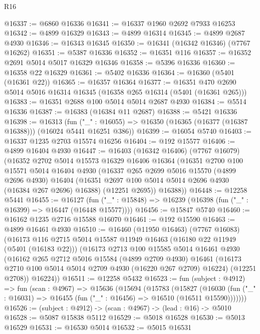 \begin{lexlean}{R16}
\begin{coremodule}
@16337 := @6860 @16336
@16341 := @16337 @1960 @2692 @7933 @16253
@16342 := @4899 @16329
@16343 := @4899 @16314
@16345 := @4899 @2687 @4930
@16346 := @16343 @16345
@16350 := @16341 (@16342 @16346) (@7767 @16262)
@16351 := @5387 @16336
@16352 := @16351 @116
@16357 := @16352 @2691 @5014 @5017 @16329 @16346
@16358 := @5396 @16336
@16360 := @16358 @22 @16329
@16361 := @5402 @16336
@16364 := @16360 (@5401 (@16361 @22))
@16365 := @16357 @16364
@16377 := @16351 @470 @2690 @5014 @5016 @16314 @16345 (@16358 @265 @16314 (@5401 (@16361 @265)))
@16383 := @16351 @2688 @100 @5014 @5014 @2687 @4930
@16384 := @5514 @16336
@16387 := @16383 (@16384 @11 @2687)
@16388 := @5421 @16336
@16398 := @16313
    (fun ("_" : @16055) => @16350 (@16365 (@16377 (@16387 @16388))) (@16024 @5441 @16251 @386))
@16399 := @16054 @5740
@16403 := @16337 @1235 @2703 @15574 @16256
@16404 := @192 @15577
@16406 := @4899 @16404 @4930
@16447 := @16403
    (@16342 @16406)
    (@7767 @16079)
    (@16352
      @2702
      @5014
      @15573
      @16329
      @16406
      @16364
      (@16351
        @2700
        @100
        @15571
        @5014
        @16404
        @4930
        (@16337
          @265
          @2699
          @5016
          @15570
          (@4899 @2696 @4930)
          @16404
          (@16351 @2697 @100 @5014 @5014 @2696 @4930 (@16384 @267 @2696) @16388)
          (@12251 @2695))
        @16388))
@16448 := @12258 @5441
@16455 := @16127
    (fun ("_" : @15848) => @16239 (@16398 (fun ("_" : @16399) => @16447 (@16448 @15577))))
@16456 := @15847 @5740
@16460 := @16162 @1235 @2716 @15588 @16070
@16461 := @192 @15590
@16463 := @4899 @16461 @4930
@16510 := @16460
    (@11950 @16463)
    (@7767 @16083)
    (@16173
      @116
      @2715
      @5014
      @15587
      @11949
      @16463
      (@16180 @22 @11949 (@5401 (@16183 @22)))
      (@16173
        @2713
        @100
        @15585
        @5014
        @16461
        @4930
        (@16162
          @265
          @2712
          @5016
          @15584
          (@4899 @2709 @4930)
          @16461
          (@16173 @2710 @100 @5014 @5014 @2709 @4930 (@16220 @267 @2709) @16224)
          (@12251 @2708))
        @16224))
@16511 := @12258 @5432
@16523 := fun (subject : @4912) =>
  fun (scan : @4967) =>
  @15636
    (@15694
      (@15783
        (@15827
          (@16030 (fun ("_" : @16031) => @16455 (fun ("_" : @16456) => @16510 (@16511 @15590)))))))
@16526 := (subject : @4912) -> (scan : @4967) -> (lead : @16) -> @5010
@16528 := @5087 @15838 @5112
@16529 := @5018 @16528
@16530 := @5013 @16529
@16531 := @16530 @5014
@16532 := @5015 @16531

\end{coremodule}
\end{lexlean}
